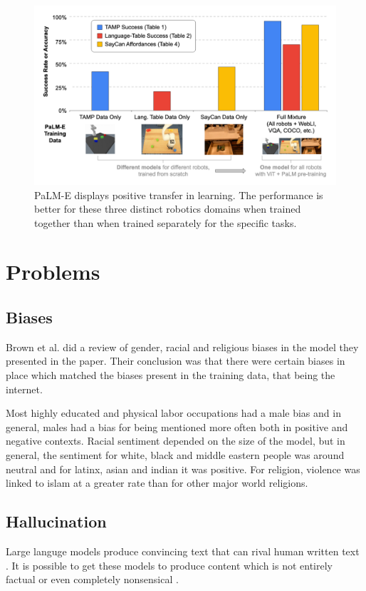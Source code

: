 \documentclass[twoside]{article}
\begin{document}
\begin{figure}[h]
  \centering
  \includegraphics*[scale=0.1]{img/palm-e-transfer.png}
  \caption{
    PaLM-E displays positive transfer in learning. The performance is better for these three
    distinct robotics domains when trained together than when trained separately for the 
    specific tasks. \cite{driess_palm-e_2023}
  }
\end{figure}


\section{Problems}
\subsection{Biases}
Brown et al. \cite{brown_language_2020} did a review of gender, racial and religious
biases in the model they presented in the paper. Their conclusion was that there were
certain biases in place which matched the biases present in the training data, that being
the internet. 

Most highly educated and physical labor occupations had a male bias and in general, males
had a bias for being mentioned more often both in positive and negative contexts. Racial
sentiment depended on the size of the model, but in general, the sentiment for white,
black and middle eastern people was around neutral and for latinx, asian and indian it was
positive. For religion, violence was linked to islam at a greater rate than for other
major world religions.

\subsection{Hallucination}
Large languge models produce convincing text that can rival human written text \cite{brown_language_2020}.
It is possible to get these models to produce content which is 
not entirely factual or even completely nonsensical \cite{ji_survey_2023}. 
\end{document}

